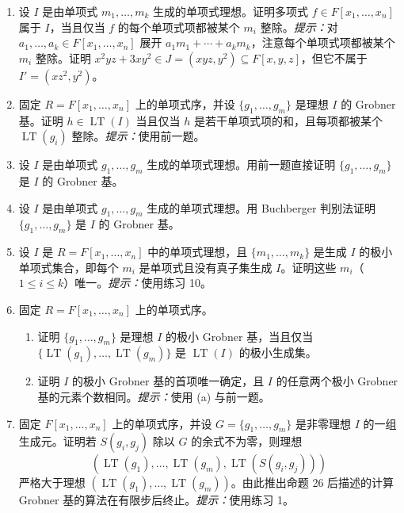 \begin{enumerate}[label=\arabic*.]
	\item 设 $I$ 是由单项式 $m_1,\ldots,m_k$ 生成的单项式理想。证明多项式 $f\in F[x_1,\ldots,x_n]$ 属于 $I$，当且仅当 $f$ 的每个单项式项都被某个 $m_i$ 整除。\emph{提示：}对 $a_1,
	\ldots,a_k\in F[x_1,
	\ldots,x_n]$ 展开 $a_1m_1+\cdots+a_km_k$，注意每个单项式项都被某个 $m_i$ 整除。证明 $x^2yz+3xy^2\in J=(xyz,y^2)\subseteq F[x,y,z]$，但它不属于 $I'=(xz^2,y^2)$。
	
	\item 固定 $R=F[x_1,\ldots,x_n]$ 上的单项式序，并设 $\{g_1,\ldots,g_m\}$ 是理想 $I$ 的 Grobner 基。证明 $h\in\operatorname{LT}(I)$ 当且仅当 $h$ 是若干单项式项的和，且每项都被某个 $\operatorname{LT}(g_i)$ 整除。\emph{提示：}使用前一题。
	
	\item 设 $I$ 是由单项式 $g_1,\ldots,g_m$ 生成的单项式理想。用前一题直接证明 $\{g_1,\ldots,g_m\}$ 是 $I$ 的 Grobner 基。
	
	\item 设 $I$ 是由单项式 $g_1,\ldots,g_m$ 生成的单项式理想。用 Buchberger 判别法证明 $\{g_1,\ldots,g_m\}$ 是 $I$ 的 Grobner 基。
	
	\item 设 $I$ 是 $R=F[x_1,\ldots,x_n]$ 中的单项式理想，且 $\{m_1,
	\ldots,m_k\}$ 是生成 $I$ 的极小单项式集合，即每个 $m_i$ 是单项式且没有真子集生成 $I$。证明这些 $m_i$（$1\leq i\leq k$）唯一。\emph{提示：}使用练习 10。
	
	\item 固定 $R=F[x_1,
	\ldots,x_n]$ 上的单项式序。
	\begin{enumerate}[label=(\alph*)]
		\item 证明 $\{g_1,\ldots,g_m\}$ 是理想 $I$ 的极小 Grobner 基，当且仅当 $\{\operatorname{LT}(g_1),\ldots,\operatorname{LT}(g_m)\}$ 是 $\operatorname{LT}(I)$ 的极小生成集。
		\item 证明 $I$ 的极小 Grobner 基的首项唯一确定，且 $I$ 的任意两个极小 Grobner 基的元素个数相同。\emph{提示：}使用 (a) 与前一题。
	\end{enumerate}
	
	\item 固定 $F[x_1,
	\ldots,x_n]$ 上的单项式序，并设 $G=\{g_1,
	\ldots,g_m\}$ 是非零理想 $I$ 的一组生成元。证明若 $S(g_i,g_j)$ 除以 $G$ 的余式不为零，则理想
	\[
	(\operatorname{LT}(g_1),\ldots,\operatorname{LT}(g_m),\operatorname{LT}(S(g_i,g_j)))
	\]
	严格大于理想 $(\operatorname{LT}(g_1),\ldots,\operatorname{LT}(g_m))$。由此推出命题 26 后描述的计算 Grobner 基的算法在有限步后终止。\emph{提示：}使用练习 1。
	

\end{enumerate}
